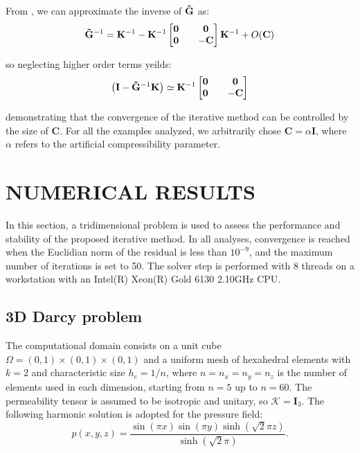 \documentclass{wccm2024}
\begin{document}
From \cite{gurtin1982introduction}, we can approximate the inverse of $\mathbf{\Tilde{G}}$ as:
\vskip -0.3cm
\begin{equation}
    \mathbf{\Tilde{G}}^{-1} = \mathbf{K}^{-1}-\mathbf{K}^{-1}
    \begin{bmatrix}
        \mathbf{0} && \mathbf{0} \\
        \mathbf{0} && -\mathbf{C}
    \end{bmatrix}
    \mathbf{K}^{-1} + O(\mathbf{C})
\end{equation}

\noindent so neglecting higher order terms yeilds:
\vskip -0.3cm
\begin{equation}
    \left( \mathbf{I} - \mathbf{\Tilde{G}}^{-1} \mathbf{K} \right) \simeq \mathbf{K}^{-1}
    \begin{bmatrix}
        \mathbf{0} && \mathbf{0} \\
        \mathbf{0} && -\mathbf{C}
    \end{bmatrix}
\end{equation}

\noindent demonstrating that the convergence of the iterative method can be controlled by the size of $\mathbf{C}$. For all the examples analyzed, we arbitrarily chose $\mathbf{C}=\alpha \mathbf{I}$, where $\alpha$ refers to the artificial compressibility parameter.

\section{NUMERICAL RESULTS}

In this section, a tridimensional problem is used to assess the performance and stability of the proposed iterative method. In all analyses, convergence is reached when the Euclidian norm of the residual is less than $10^{-9}$, and the maximum number of iterations is set to 50. The solver step is performed with 8 threads on a workstation with an Intel(R) Xeon(R) Gold 6130 2.10GHz CPU.

\subsection{3D Darcy problem}

The computational domain consists on a unit cube $\Omega=(0,1)\times(0,1)\times(0,1)$ and a uniform mesh of hexahedral elements with $k=2$ and characteristic size $h_e=1/n$, where $n=n_x=n_y=n_z$ is the number of elements used in each dimension, starting from $n=5$ up to $n=60$.  The permeability tensor is assumed to be isotropic and unitary, so $\mathcal{K}=\mathbf{I}_3$. The following harmonic solution is adopted for the pressure field:
\vskip -0.3cm
\begin{equation} \label{eq:analytic-pressure}
    p(x,y,z) = \frac{\sin(\pi x) \sin(\pi y) \sinh(\sqrt{2}\pi z)}{\sinh(\sqrt{2}\pi)} \text{.}
\end{equation}
\end{document}
